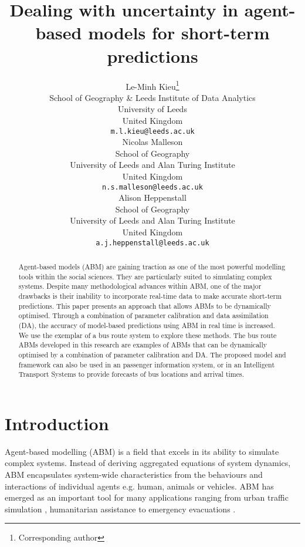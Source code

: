 \documentclass{article}
\title{Dealing with uncertainty in agent-based models for short-term predictions}
\author{
  Le-Minh Kieu\thanks{Corresponding author} \\
  School of Geography \& Leeds Institute of Data Analytics\\
  University of Leeds\\
  United Kingdom \\
  \texttt{m.l.kieu@leeds.ac.uk} \\
   \And
 Nicolas Malleson \\
  School of Geography\\
  University of Leeds and Alan Turing Institute\\
  United Kingdom \\
  \texttt{n.s.malleson@leeds.ac.uk} \\
  \And
 Alison Heppenstall \\
  School of Geography\\
  University of Leeds and Alan Turing Institute\\
  United Kingdom \\
  \texttt{a.j.heppenstall@leeds.ac.uk} \\
}
\begin{document}
\maketitle

\begin{abstract}
Agent-based models (ABM) are gaining traction as one of the most powerful modelling tools within the social sciences.
They are particularly suited to simulating complex systems. Despite many methodological advances within ABM, one of the major drawbacks is their inability to 
incorporate real-time data to make accurate short-term predictions. This paper presents an approach that allows ABMs to be dynamically optimised. Through a combination of parameter calibration and data assimilation (DA), the accuracy of model-based predictions using ABM in real time is increased.  We use the exemplar of a bus route system to explore these methods.  
The bus route ABMs developed in this research are examples of ABMs that can be dynamically optimised by a combination of parameter calibration and DA. The proposed model and framework can also be used in an passenger information system, or in an Intelligent Transport Systems to provide forecasts of bus locations and arrival times. 
\end{abstract}




\section{Introduction} 
\label{s:Intro}

Agent-based modelling (ABM) \citep{bonabeau_agent_2002} is a field that excels in its ability to simulate
complex systems. Instead of deriving aggregated equations of system
dynamics, ABM encapsulates system-wide characteristics from the
behaviours and interactions of individual agents e.g. human, animals
or vehicles. ABM has emerged as an important tool for many 
applications ranging from urban traffic simulation
\citep{balmer2009matsim}, humanitarian assistance
\citep{crooks_gis_2013} to emergency evacuations
\citep{schoenharl_design_2011}.
\end{document}
